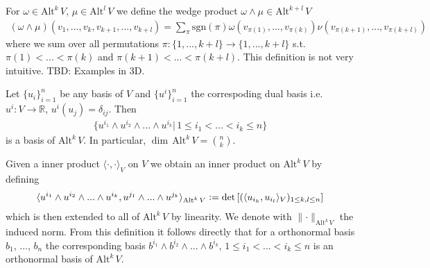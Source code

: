 \documentclass[12pt,a4paper]{article}
\numberwithin{equation}{subsection}
\numberwithin{lemma}{subsection}
\theoremstyle{definition}
\newcommand{\alternating}[2]{ {\text{Alt}^{#1}\,#2} }
\newcommand{\real}{\mathbb{R}}
\begin{document}
For $\omega \in 
\alternating{k}{V}$, $\mu \in 
\alternating{l}{V}$ we define the wedge product $\omega \wedge \mu \in 
\alternating{k+l}{V}$ 
\begin{align*}
    (\omega \wedge \mu) (v_1,...,v_k,v_{k+1},...,v_{k+l}) =
    \sum\limits_\pi
    \text{sgn}(\pi) \omega(v_{\pi(1)},...,v_{\pi(k)}) 
    \nu(v_{\pi(k+1)},...,v_{\pi(k+l)})
\end{align*}
where we sum over all permutations 
$\pi: \{1,...,k+l\} \rightarrow \{1,...,k+l\}$ 
s.t. $\pi(1) < ... < \pi(k)$ and $\pi(k+1) < ... < \pi(k+l)$.
This definition is not very intuitive.
{\color{red} TBD: Examples in 3D}.

Let $\{ u_i\}_{i=1}^n$ be any basis of $V$ and $\{ u^i\}_{i=1}^n$ the 
correspoding dual basis i.e. 
$u^i:V \rightarrow \real$, $u^i(u_j) = \delta_{ij}$. Then 
\begin{align*}
    \{u^{i_1} \wedge u^{i_2} \wedge ... \wedge u^{i_k} | \, 
    1 \leq i_1 < ... < i_k \leq n \}
\end{align*}
is a basis of $\alternating{k}{V}$. In particular, 
$\dim\, \alternating{k}{V} = \binom{n}{k}$.

Given a inner product $\langle\cdot, \cdot \rangle_V$ on $V$ we obtain an inner 
product on $\alternating{k}{V}$ by defining
\begin{align*}
    \langle u^{i_1} \wedge u^{i_2} \wedge... \wedge u^{i_k}, 
    u^{j_1} \wedge... \wedge u^{j_k} \rangle_{\alternating{k}{V}} 
    \vcentcolon= \det \left[ ( \langle u_{i_k}, u_{i_l} \rangle_V )_
    {1\leq k,l \leq n} \right] 
\end{align*}
which is then extended to all of $\alternating{k}{V}$ by linearity. 
We denote with $\lVert \cdot \rVert _\alternating{k}{V}$ the induced norm.
From this definition it follows directly that for a orthonormal basis 
$b_1$, ..., $b_n$ the corresponding basis 
$b^{i_1} \wedge b^{i_2} \wedge ... \wedge b^{i_k}$, 
$1\leq i_1 < ... < i_k \leq n$ is an orthonormal basis of $\alternating{k}{V}$.
\end{document}
